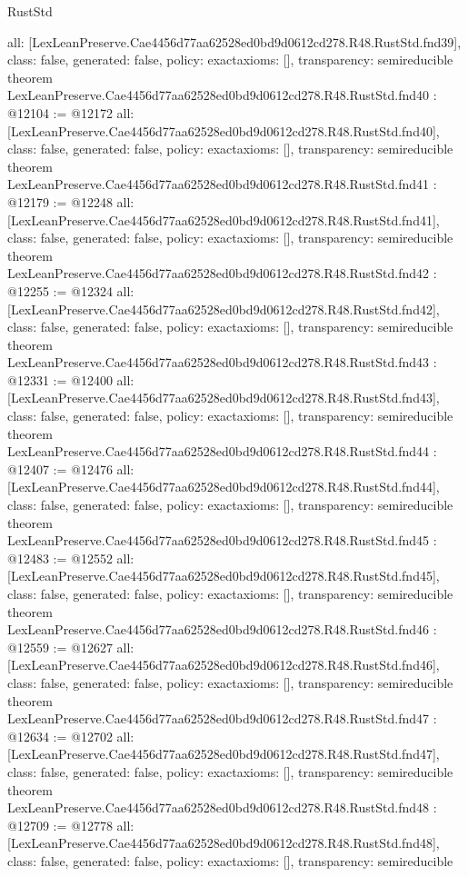 \begin{lexlean}{RustStd}
\begin{coremodule}
{  all: [LexLeanPreserve.Cae4456d77aa62528ed0bd9d0612cd278.R48.RustStd.fnd39],
  class: false,
  generated: false,
  policy: exact{axioms: []},
  transparency: semireducible
}
theorem LexLeanPreserve.Cae4456d77aa62528ed0bd9d0612cd278.R48.RustStd.fnd40 : @12104 := @12172 {
  all: [LexLeanPreserve.Cae4456d77aa62528ed0bd9d0612cd278.R48.RustStd.fnd40],
  class: false,
  generated: false,
  policy: exact{axioms: []},
  transparency: semireducible
}
theorem LexLeanPreserve.Cae4456d77aa62528ed0bd9d0612cd278.R48.RustStd.fnd41 : @12179 := @12248 {
  all: [LexLeanPreserve.Cae4456d77aa62528ed0bd9d0612cd278.R48.RustStd.fnd41],
  class: false,
  generated: false,
  policy: exact{axioms: []},
  transparency: semireducible
}
theorem LexLeanPreserve.Cae4456d77aa62528ed0bd9d0612cd278.R48.RustStd.fnd42 : @12255 := @12324 {
  all: [LexLeanPreserve.Cae4456d77aa62528ed0bd9d0612cd278.R48.RustStd.fnd42],
  class: false,
  generated: false,
  policy: exact{axioms: []},
  transparency: semireducible
}
theorem LexLeanPreserve.Cae4456d77aa62528ed0bd9d0612cd278.R48.RustStd.fnd43 : @12331 := @12400 {
  all: [LexLeanPreserve.Cae4456d77aa62528ed0bd9d0612cd278.R48.RustStd.fnd43],
  class: false,
  generated: false,
  policy: exact{axioms: []},
  transparency: semireducible
}
theorem LexLeanPreserve.Cae4456d77aa62528ed0bd9d0612cd278.R48.RustStd.fnd44 : @12407 := @12476 {
  all: [LexLeanPreserve.Cae4456d77aa62528ed0bd9d0612cd278.R48.RustStd.fnd44],
  class: false,
  generated: false,
  policy: exact{axioms: []},
  transparency: semireducible
}
theorem LexLeanPreserve.Cae4456d77aa62528ed0bd9d0612cd278.R48.RustStd.fnd45 : @12483 := @12552 {
  all: [LexLeanPreserve.Cae4456d77aa62528ed0bd9d0612cd278.R48.RustStd.fnd45],
  class: false,
  generated: false,
  policy: exact{axioms: []},
  transparency: semireducible
}
theorem LexLeanPreserve.Cae4456d77aa62528ed0bd9d0612cd278.R48.RustStd.fnd46 : @12559 := @12627 {
  all: [LexLeanPreserve.Cae4456d77aa62528ed0bd9d0612cd278.R48.RustStd.fnd46],
  class: false,
  generated: false,
  policy: exact{axioms: []},
  transparency: semireducible
}
theorem LexLeanPreserve.Cae4456d77aa62528ed0bd9d0612cd278.R48.RustStd.fnd47 : @12634 := @12702 {
  all: [LexLeanPreserve.Cae4456d77aa62528ed0bd9d0612cd278.R48.RustStd.fnd47],
  class: false,
  generated: false,
  policy: exact{axioms: []},
  transparency: semireducible
}
theorem LexLeanPreserve.Cae4456d77aa62528ed0bd9d0612cd278.R48.RustStd.fnd48 : @12709 := @12778 {
  all: [LexLeanPreserve.Cae4456d77aa62528ed0bd9d0612cd278.R48.RustStd.fnd48],
  class: false,
  generated: false,
  policy: exact{axioms: []},
  transparency: semireducible
}
\end{coremodule}
\end{lexlean}
